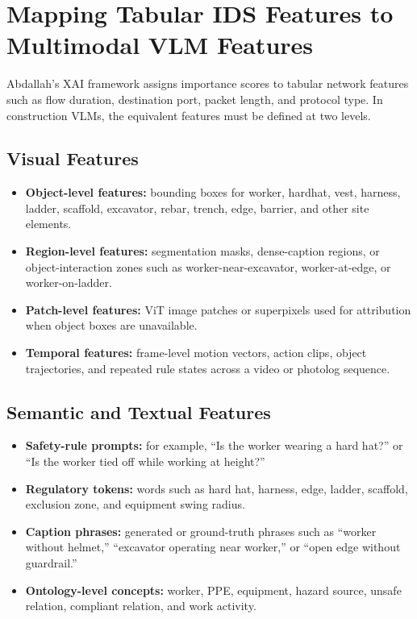 \documentclass[10pt]{article}
\begin{document}
\section{Mapping Tabular IDS Features to Multimodal VLM Features}
Abdallah's XAI framework assigns importance scores to tabular network features such as flow duration, destination port, packet length, and protocol type. In construction VLMs, the equivalent features must be defined at two levels.

\subsection{Visual Features}
\begin{itemize}
  \item \textbf{Object-level features:} bounding boxes for worker, hardhat, vest, harness, ladder, scaffold, excavator, rebar, trench, edge, barrier, and other site elements.
  \item \textbf{Region-level features:} segmentation masks, dense-caption regions, or object-interaction zones such as worker-near-excavator, worker-at-edge, or worker-on-ladder.
  \item \textbf{Patch-level features:} ViT image patches or superpixels used for attribution when object boxes are unavailable.
  \item \textbf{Temporal features:} frame-level motion vectors, action clips, object trajectories, and repeated rule states across a video or photolog sequence.
\end{itemize}

\subsection{Semantic and Textual Features}
\begin{itemize}
  \item \textbf{Safety-rule prompts:} for example, ``Is the worker wearing a hard hat?'' or ``Is the worker tied off while working at height?''
  \item \textbf{Regulatory tokens:} words such as hard hat, harness, edge, ladder, scaffold, exclusion zone, and equipment swing radius.
  \item \textbf{Caption phrases:} generated or ground-truth phrases such as ``worker without helmet,'' ``excavator operating near worker,'' or ``open edge without guardrail.''
  \item \textbf{Ontology-level concepts:} worker, PPE, equipment, hazard source, unsafe relation, compliant relation, and work activity.
\end{itemize}
\end{document}
